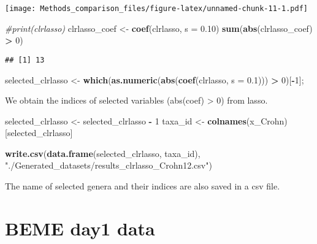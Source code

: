 \documentclass[]{book}
\newenvironment{Shaded}{\begin{snugshade}}{\end{snugshade}}
\newcommand{\KeywordTok}[1]{\textcolor[rgb]{0.13,0.29,0.53}{\textbf{#1}}}
\newcommand{\DataTypeTok}[1]{\textcolor[rgb]{0.13,0.29,0.53}{#1}}
\newcommand{\DecValTok}[1]{\textcolor[rgb]{0.00,0.00,0.81}{#1}}
\newcommand{\FloatTok}[1]{\textcolor[rgb]{0.00,0.00,0.81}{#1}}
\newcommand{\StringTok}[1]{\textcolor[rgb]{0.31,0.60,0.02}{#1}}
\newcommand{\CommentTok}[1]{\textcolor[rgb]{0.56,0.35,0.01}{\textit{#1}}}
\newcommand{\OperatorTok}[1]{\textcolor[rgb]{0.81,0.36,0.00}{\textbf{#1}}}
\newcommand{\NormalTok}[1]{#1}
\begin{document}
\texttt{[image: Methods\_comparison\_files/figure-latex/unnamed-chunk-11-1.pdf]}

\begin{Shaded}
\begin{Highlighting}[]
\CommentTok{#print(clrlasso)}
\NormalTok{clrlasso_coef <-}\StringTok{ }\KeywordTok{coef}\NormalTok{(clrlasso, }\DataTypeTok{s =} \FloatTok{0.10}\NormalTok{)}
\KeywordTok{sum}\NormalTok{(}\KeywordTok{abs}\NormalTok{(clrlasso_coef) }\OperatorTok{>}\StringTok{ }\DecValTok{0}\NormalTok{)}
\end{Highlighting}
\end{Shaded}

\begin{verbatim}
## [1] 13
\end{verbatim}

\begin{Shaded}
\begin{Highlighting}[]
\NormalTok{selected_clrlasso <-}\StringTok{ }\KeywordTok{which}\NormalTok{(}\KeywordTok{as.numeric}\NormalTok{(}\KeywordTok{abs}\NormalTok{(}\KeywordTok{coef}\NormalTok{(clrlasso, }\DataTypeTok{s =} \FloatTok{0.1}\NormalTok{))) }\OperatorTok{>}\StringTok{ }\DecValTok{0}\NormalTok{)[}\OperatorTok{-}\DecValTok{1}\NormalTok{]; }
\end{Highlighting}
\end{Shaded}

We obtain the indices of selected variables (abs(coef) \textgreater{} 0)
from lasso.

\begin{Shaded}
\begin{Highlighting}[]
\NormalTok{selected_clrlasso <-}\StringTok{ }\NormalTok{selected_clrlasso }\OperatorTok{-}\StringTok{ }\DecValTok{1}
\NormalTok{taxa_id <-}\StringTok{ }\KeywordTok{colnames}\NormalTok{(x_Crohn)[selected_clrlasso]}

\KeywordTok{write.csv}\NormalTok{(}\KeywordTok{data.frame}\NormalTok{(selected_clrlasso, taxa_id),}
          \StringTok{"./Generated_datasets/results_clrlasso_Crohn12.csv"}\NormalTok{)}
\end{Highlighting}
\end{Shaded}

The name of selected genera and their indices are also saved in a csv
file.

\section{BEME day1 data}\label{beme-day1-data-2}
\end{document}
